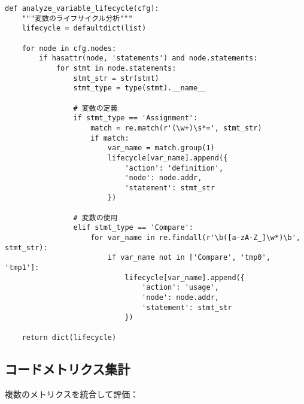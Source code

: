 \documentclass[12pt,a4paper]{article}
\begin{document}
\begin{lstlisting}[caption=変数のライフサイクル分析]
def analyze_variable_lifecycle(cfg):
    """変数のライフサイクル分析"""
    lifecycle = defaultdict(list)

    for node in cfg.nodes:
        if hasattr(node, 'statements') and node.statements:
            for stmt in node.statements:
                stmt_str = str(stmt)
                stmt_type = type(stmt).__name__

                # 変数の定義
                if stmt_type == 'Assignment':
                    match = re.match(r'(\w+)\s*=', stmt_str)
                    if match:
                        var_name = match.group(1)
                        lifecycle[var_name].append({
                            'action': 'definition',
                            'node': node.addr,
                            'statement': stmt_str
                        })

                # 変数の使用
                elif stmt_type == 'Compare':
                    for var_name in re.findall(r'\b([a-zA-Z_]\w*)\b', stmt_str):
                        if var_name not in ['Compare', 'tmp0', 'tmp1']:
                            lifecycle[var_name].append({
                                'action': 'usage',
                                'node': node.addr,
                                'statement': stmt_str
                            })

    return dict(lifecycle)
\end{lstlisting}

\subsection{コードメトリクス集計}

複数のメトリクスを統合して評価：
\end{document}
